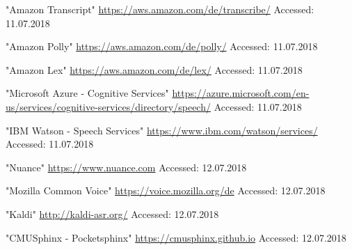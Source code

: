 \documentclass[journal]{IEEEtran}
\begin{document}
\begin{thebibliography}{1}
"Amazon Transcript"
\url{https://aws.amazon.com/de/transcribe/}
Accessed: 11.07.2018

"Amazon Polly"
\url{https://aws.amazon.com/de/polly/}
Accessed: 11.07.2018

"Amazon Lex"
\url{https://aws.amazon.com/de/lex/}
Accessed: 11.07.2018

"Microsoft Azure - Cognitive Services"
\url{https://azure.microsoft.com/en-us/services/cognitive-services/directory/speech/}
Accessed: 11.07.2018

"IBM Watson - Speech Services"
\url{https://www.ibm.com/watson/services/}
Accessed: 11.07.2018

"Nuance"
\url{https://www.nuance.com}
Accessed: 12.07.2018

"Mozilla Common Voice"
\url{https://voice.mozilla.org/de}
Accessed: 12.07.2018

"Kaldi"
\url{http://kaldi-asr.org/}
Accessed: 12.07.2018

"CMUSphinx - Pocketsphinx"
\url{https://cmusphinx.github.io}
Accessed: 12.07.2018
\end{thebibliography}
\end{document}
